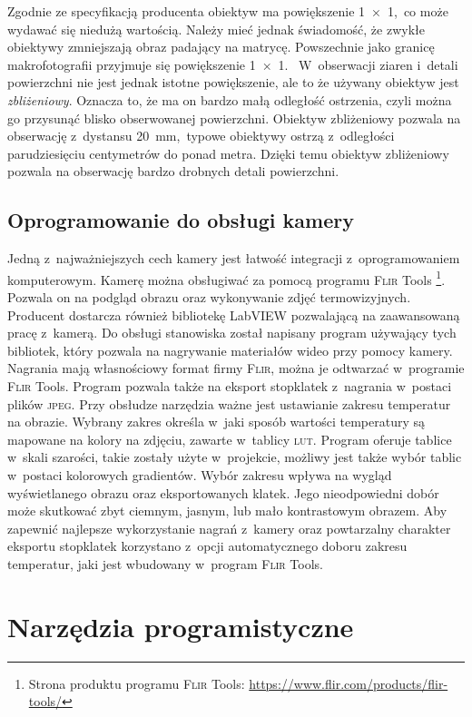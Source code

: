 Zgodnie ze specyfikacją producenta obiektyw ma powiększenie \num{1x1},~co może
wydawać się niedużą wartością.
Należy mieć jednak świadomość, że zwykłe obiektywy zmniejszają obraz padający na
matrycę.
Powszechnie jako granicę makrofotografii przyjmuje się powiększenie \num{1x1}.~%
W~obserwacji ziaren i~detali powierzchni nie jest jednak istotne powiększenie,
ale to że używany obiektyw jest \emph{zbliżeniowy}.
Oznacza to, że ma on bardzo małą odległość ostrzenia, czyli można go przysunąć
blisko obserwowanej powierzchni.
Obiektyw zbliżeniowy pozwala na obserwację z~dystansu
\SI{20}{\milli\meter},~typowe obiektywy ostrzą z~odległości parudziesięciu
centymetrów do ponad metra.
Dzięki temu obiektyw zbliżeniowy pozwala na obserwację bardzo drobnych detali
powierzchni.

\subsection{Oprogramowanie do obsługi kamery}
\label{subsec:camera_soft}
Jedną z~najważniejszych cech kamery jest łatwość integracji z~oprogramowaniem
komputerowym.
Kamerę można obsługiwać za pomocą programu \textsc{Flir} Tools%
\footnote{%
    Strona produktu programu \textsc{Flir} Tools:
    \url{https://www.flir.com/products/flir-tools/}
}.
Pozwala on na podgląd obrazu oraz wykonywanie zdjęć termowizyjnych.
Producent dostarcza również bibliotekę LabVIEW pozwalającą na zaawansowaną
pracę z~kamerą.
Do obsługi stanowiska został napisany program używający tych bibliotek, który
pozwala na nagrywanie materiałów wideo przy pomocy kamery.
Nagrania mają własnościowy format firmy \textsc{Flir}, można je odtwarzać
w~programie \textsc{Flir} Tools.
Program pozwala także na eksport stopklatek z~nagrania w~postaci plików
\textsc{jpeg}.
Przy obsłudze narzędzia ważne jest ustawianie zakresu temperatur na obrazie.
Wybrany zakres określa w~jaki sposób wartości temperatury są mapowane na kolory
na zdjęciu, zawarte w~tablicy \textsc{lut}.
Program oferuje tablice w~skali szarości, takie zostały użyte w~projekcie,
możliwy jest także wybór tablic w~postaci kolorowych gradientów.
Wybór zakresu wpływa na wygląd wyświetlanego obrazu oraz eksportowanych klatek.
Jego nieodpowiedni dobór może skutkować zbyt ciemnym, jasnym, lub mało
kontrastowym obrazem.
Aby zapewnić najlepsze wykorzystanie nagrań z~kamery oraz powtarzalny charakter
eksportu stopklatek korzystano z~opcji automatycznego doboru zakresu temperatur, 
jaki jest wbudowany w~program \textsc{Flir} Tools.

\section{Narzędzia programistyczne}

